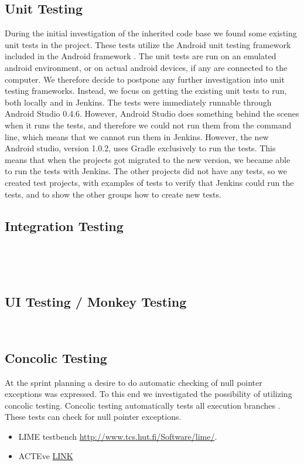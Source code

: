 \subsection{Unit Testing}
During the initial investigation of the inherited code base we found some existing unit tests in the  project. These tests utilize the Android unit testing framework included in the Android framework \parencite{AndroidUnit}. The unit tests are run on an emulated android environment, or on actual android devices, if any are connected to the computer. We therefore decide to postpone any further investigation into unit testing frameworks. Instead, we focus on getting the existing unit tests to run, both locally and in Jenkins. The tests were immediately runnable through Android Studio 0.4.6. However, Android Studio does something behind the scenes when it runs the tests, and therefore we could not run them from the command line, which means that we cannot run them in Jenkins. However, the new Android studio, version 1.0.2, uses Gradle exclusively to run the tests. This means that when the projects got migrated to the new version, we became able to run the tests with Jenkins. 
The other projects did not have any tests, so we created test projects, with examples of tests to verify that Jenkins could run the tests, and to show the other groups how to create new tests.
\subsection{Integration Testing}
\dummy~\dummy~\dummy

\dummy~\dummy~\dummy~
\subsection{UI Testing / Monkey Testing}
\dummy~\dummy~\dummy~\dummy~\dummy~\dummy~
\subsection{Concolic Testing}
At the sprint planning a desire to do automatic checking of null pointer exceptions was expressed. To this end we investigated the possibility of utilizing concolic testing. Concolic testing automatically tests all execution branches \parencite{concolic_testing_2015}. These tests can check for null pointer exceptions.


\begin{itemize}
  \item LIME testbench \url{http://www.tcs.hut.fi/Software/lime/}.
  \item ACTEve \href{http://delivery.acm.org/10.1145/2400000/2393666/a59-anand.pdf?ip=130.225.198.195&id=2393666&acc=ACTIVE\%20SERVICE&key=36332CD97FA87885\%2E1DDFD8390336D738\%2E4D4702B0C3E38B35\%2E4D4702B0C3E38B35&CFID=627209490&CFTOKEN=76801213&__acm__=1424945812_ab641600a5058e5b199a617b521e4023}{LINK}
\end{itemize}

